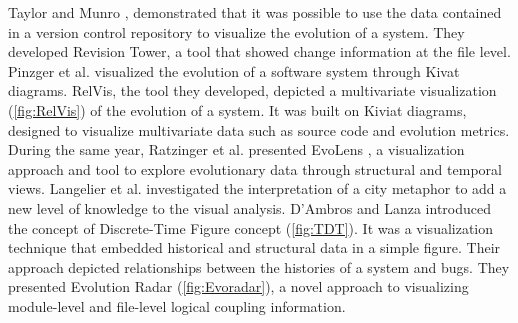 Taylor and Munro \cite{Taylor2002},  demonstrated that it was possible to use the data contained in a version control repository to visualize the evolution of a system.
They developed Revision Tower, a tool that showed change information at the file level. 
Pinzger et al. \cite{Pinzger2005} visualized the evolution of a software system through Kivat diagrams.
RelVis, the tool they developed, depicted a multivariate visualization (\autoref{fig:RelVis}) of the evolution of a system. It was built on Kiviat diagrams, designed to visualize multivariate data such as source code and evolution metrics. 
During the same year, Ratzinger et al. presented EvoLens \cite{Ratzinger2005}, a visualization approach and tool to 
explore evolutionary data through structural and temporal views.
Langelier et al. \cite{Langelier2005} investigated the interpretation of a city metaphor 
\cite{Knight2000} to add a new level of knowledge to the visual analysis.
D’Ambros and Lanza \cite{DAmbros2006} introduced the concept of Discrete-Time Figure concept (\autoref{fig:TDT}). It was a visualization technique that embedded historical and structural data in a simple figure. 
Their approach depicted relationships between the histories of a system and bugs. 
They presented Evolution Radar \cite{DAmbros2006a} (\autoref{fig:Evoradar}), a novel approach to visualizing module-level and file-level logical coupling information.

